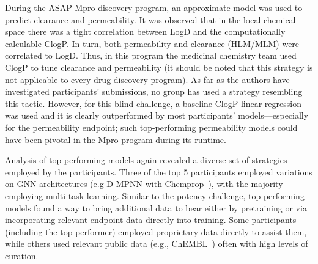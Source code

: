 \documentclass[journal=jcim,manuscript=article]{achemso}
\begin{document}
{%
During the ASAP Mpro discovery program, an approximate model was used to predict clearance and permeability. It was observed that in the local chemical space there was a tight correlation between LogD and the computationally calculable ClogP. In turn, both permeability and clearance (HLM/MLM) were correlated to LogD. Thus, in this program the medicinal chemistry team used ClogP to tune clearance and permeability (it should be noted that this strategy is not applicable to every drug discovery program). As far as the authors have investigated participants' submissions, no group has used a strategy resembling this tactic. However, for this blind challenge, a baseline ClogP linear regression was used and it is clearly outperformed by most participants' models---especially for the permeability endpoint; such top-performing permeability models could have been pivotal in the Mpro program during its runtime. 

Analysis of top performing models again revealed a diverse set of strategies employed by the participants. Three of the top 5 participants employed variations on GNN architectures (e.g D-MPNN with Chemprop~\cite{heid2023chemprop}), with the majority employing multi-task learning. Similar to the potency challenge, top performing models found a way to bring additional data to bear either by pretraining or via incorporating relevant endpoint data directly into training. Some participants (including the top performer) employed proprietary data directly to assist them, while others used relevant public data (e.g., ChEMBL~\cite{zdrazil_2024_chembl}) often with high levels of curation.

}
\end{document}
